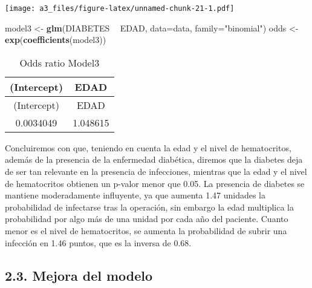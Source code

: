 \documentclass[]{article}
\newenvironment{Shaded}{\begin{snugshade}}{\end{snugshade}}
\newcommand{\DataTypeTok}[1]{\textcolor[rgb]{0.13,0.29,0.53}{#1}}
\newcommand{\KeywordTok}[1]{\textcolor[rgb]{0.13,0.29,0.53}{\textbf{#1}}}
\newcommand{\NormalTok}[1]{#1}
\newcommand{\OperatorTok}[1]{\textcolor[rgb]{0.81,0.36,0.00}{\textbf{#1}}}
\newcommand{\StringTok}[1]{\textcolor[rgb]{0.31,0.60,0.02}{#1}}
\begin{document}
\begin{Shaded}
\end{Shaded}

\texttt{[image: a3\_files/figure-latex/unnamed-chunk-21-1.pdf]}

\begin{Shaded}
\begin{Highlighting}[]
\NormalTok{model3 <-}\StringTok{ }\KeywordTok{glm}\NormalTok{(DIABETES }\OperatorTok{~}\StringTok{ }\NormalTok{EDAD, }\DataTypeTok{data=}\NormalTok{data, }\DataTypeTok{family=}\StringTok{"binomial"}\NormalTok{)}
\NormalTok{odds <-}\StringTok{ }\KeywordTok{exp}\NormalTok{(}\KeywordTok{coefficients}\NormalTok{(model3))}
\end{Highlighting}
\end{Shaded}

\begin{longtable}[]{@{}cc@{}}
\caption{Odds ratio Model3}\tabularnewline
\toprule
(Intercept) & EDAD\tabularnewline
\midrule
\endfirsthead
\toprule
(Intercept) & EDAD\tabularnewline
\midrule
\endhead
0.0034049 & 1.048615\tabularnewline
\bottomrule
\end{longtable}

Concluiremos con que, teniendo en cuenta la edad y el nivel de
hematocritos, además de la presencia de la enfermedad diabética, diremos
que la diabetes deja de ser tan relevante en la presencia de
infecciones, mientras que la edad y el nivel de hematocritos obtienen un
p-valor menor que 0.05. La presencia de diabetes se mantiene
moderadamente influyente, ya que aumenta 1.47 unidades la probabilidad
de infectarse tras la operación, sin embargo la edad multiplica la
probabilidad por algo más de una unidad por cada año del paciente.
Cuanto menor es el nivel de hematocritos, se aumenta la probabilidad de
subrir una infección en 1.46 puntos, que es la inversa de 0.68.

\hypertarget{mejora-del-modelo}{%
\subsection{2.3. Mejora del modelo}\label{mejora-del-modelo}}
\end{document}
